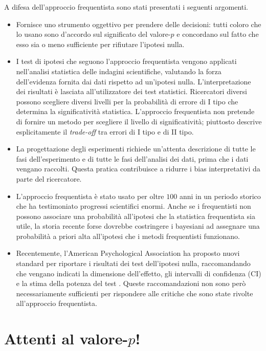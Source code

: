 A difesa dell'approccio frequentista sono stati presentati i seguenti argomenti.

\begin{itemize}
\item Fornisce uno strumento oggettivo per prendere delle decisioni: tutti coloro che lo usano sono d'accordo sul significato del valore-$p$ e concordano sul fatto che esso sia o meno sufficiente per rifiutare l'ipotesi nulla.
\item I test di ipotesi che seguono l'approccio frequentista vengono applicati nell'analisi statistica delle indagini scientifiche, valutando la forza dell'evidenza fornita dai dati rispetto ad un'ipotesi nulla. 
L'interpretazione dei risultati è lasciata all'utilizzatore dei test statistici. 
Ricercatori diversi possono scegliere diversi livelli per la probabilità di errore di I tipo che determina la significatività statistica. 
L'approccio frequentista non pretende di fornire un metodo per scegliere il livello di significatività; piuttosto descrive esplicitamente il \emph{trade-off} tra errori di I tipo e di II tipo.
\item La progettazione degli esperimenti richiede un'attenta descrizione di tutte le fasi dell'esperimento e di tutte le fasi dell'analisi dei dati, prima che i dati vengano raccolti. 
Questa pratica contribuisce a ridurre i bias interpretativi da parte del ricercatore.
\item L'approccio frequentista è stato usato per oltre $100$ anni in un periodo storico che ha testimoniato progressi scientifici enormi. Anche se i frequentisti non possono associare una probabilità all'ipotesi che la statistica frequentista sia utile, la storia recente forse dovrebbe costringere i bayesiani ad assegnare una probabilità a priori alta all'ipotesi che i metodi frequentisti funzionano.
\item Recentemente, l'American Psychological Association ha proposto nuovi standard per riportare i risultati dei test dell'ipotesi nulla,  raccomandando che vengano indicati la dimensione dell'effetto, gli intervalli di confidenza (CI) e la stima della potenza del test \cite{apa2010}. Queste raccomandazioni non sono però necessariamente sufficienti per rispondere alle critiche che sono state rivolte all'approccio frequentista.
\end{itemize}


\section{Attenti al valore-$p$!}

